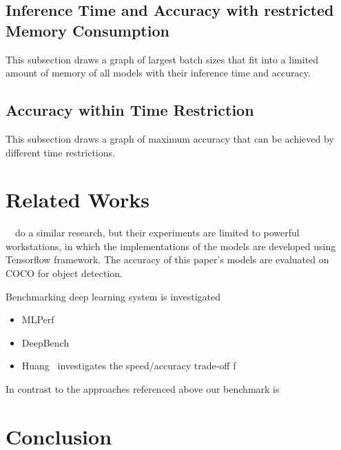 \documentclass[conference]{IEEEtran}
\begin{document}
\subsection{Inference Time and Accuracy with restricted Memory Consumption}
This subsection draws a graph of largest batch sizes that fit into a limited amount of memory of all models with their inference time and accuracy.

\subsection{Accuracy within Time Restriction}
This subsection draws a graph of maximum accuracy that can be achieved by different time restrictions. 

\section{Related Works}
~\cite{huang2017speed}~do a similar research, but their experiments are limited to powerful workstations, in which the implementations of the models are developed using Tensorflow framework. The accuracy of this paper's models are evaluated on COCO for object detection.

Benchmarking deep learning system is investigated

\begin{itemize}
    \item MLPerf
    \item DeepBench
    \item Huang~\cite{DBLP:journals/corr/HuangRSZKFFWSG016} investigates the speed/accuracy trade-off f
\end{itemize}

In contrast to the approaches referenced above our benchmark is 


\section{Conclusion}



%





\end{document}
